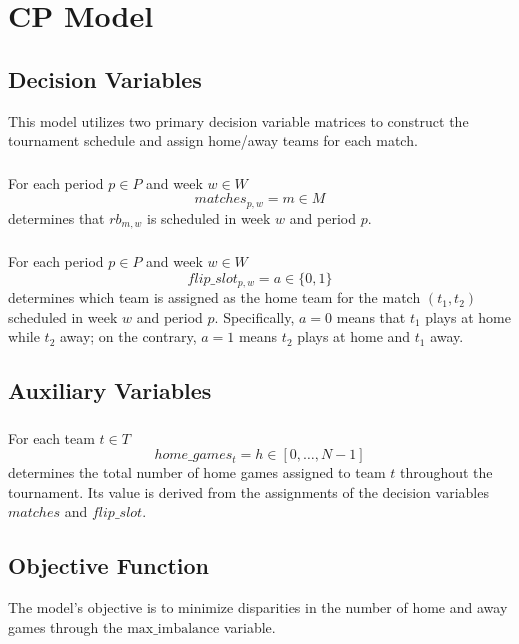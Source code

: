 \section{CP Model}
\subsection{Decision Variables}
This model utilizes two primary decision variable matrices to construct the tournament schedule and assign home/away teams for each match.

\subsubsection{}
For each period $p \in P$ and week $w \in W$
$$
matches_{p,w}=m \in M
$$
determines that $rb_{m, w}$ is scheduled in week $w$ and period $p$.


\subsubsection{}  
For each period $p \in P$ and week $w \in W$  
$$  
flip\_slot_{p,w} = a \in \{0, 1\}  
$$  
determines which team is assigned as the home team for the match $(t_1, t_2)$ scheduled in week $w$ and period $p$. Specifically, $a = 0$ means that $t_1$ plays at home while $t_2$ away; on the contrary, $a = 1$ means $t_2$ plays at home and $t_1$ away.


\subsection{Auxiliary Variables}
\subsubsection{}  
For each team $t \in T$  
$$  
home\_games_{t} = h \in [0, \dots, N-1]  
$$  
determines the total number of home games assigned to team $t$ throughout the tournament. Its value is derived from the assignments of the decision variables $matches$ and $flip\_slot$.


\subsection{Objective Function}

The model's objective is to minimize disparities in the number of home and away games through the $\text{max\_imbalance}$ variable.

